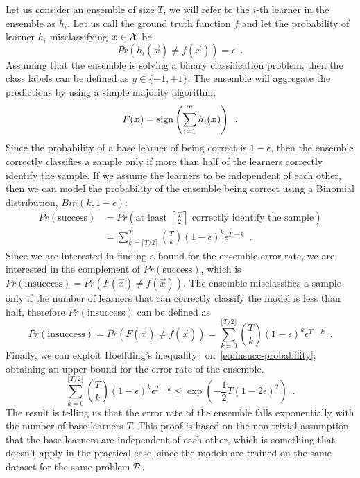 Let us consider an ensemble of size $T$, we will refer to the $i$-th learner in the ensemble as
$h_i$. Let us call the ground truth function $f$ and let the probability of learner $h_i$
misclassifying $\boldsymbol{x} \in \mathcal{X}$ be
\begin{equation}
	\label{eq:error-rate}
	Pr(h_i(\vec{x}) \neq f(\vec{x})) = \epsilon \enspace.
\end{equation}
Assuming that the ensemble is solving a binary classification problem, then the class labels can be defined as $y \in \{-1, +1\}$. The ensemble will aggregate the predictions by using a simple majority algorithm; 
\begin{equation}
	\label{eq:ensemble-aggregation}
	F(\boldsymbol{x}) = \operatorname{sign}\left(\sum_{i = 1}^{T}h_i(\boldsymbol{x})\right) \enspace.
\end{equation}
Since the probability of a base learner of being correct is $1 - \epsilon$, then the ensemble
correctly classifies a sample only if more than half of the learners correctly identify the sample.
If we assume the learners to be independent of each other, then we can model the probability of the
ensemble being correct using a Binomial distribution, $Bin(k, 1 - \epsilon)$:
\begin{equation}
	\label{eq:succ-probability}
	\begin{aligned}
		Pr(\text{success}) & = Pr\left(\text{at least } \left\lceil{\frac{T}{2}}\right\rceil \text{ correctly identify
		the sample}\right)
		\\
			   & = \sum_{k = \lceil{T / 2}\rceil}^T \binom{T}{k} (1 - \epsilon)^k
			   \epsilon^{T - k} \enspace.
	\end{aligned}
\end{equation}
Since we are interested in finding a bound for the ensemble error rate, we are interested in the
complement of $Pr(\text{success})$, which is $Pr(\text{insuccess}) = Pr(F(\vec{x}) \neq
f(\vec{x}))$. The ensemble misclassifies a sample only if the number of learners that can correctly
classify the model is less than half, therefore $Pr(\text{insuccess})$ can be defined as
\begin{equation}
	\label{eq:insucc-probability}
	Pr(\text{insuccess}) = Pr(F(\vec{x}) \neq f(\vec{x})) = \sum_{k = 0}^{\lfloor{T / 2}\rfloor}
	\binom{T}{k} (1 - \epsilon)^k \epsilon^{T - k} \enspace.
\end{equation}
Finally, we can exploit Hoeffding's inequality~\cite{ZhouZhi-Hua2021ML}
on~\ref{eq:insucc-probability}, obtaining an upper bound for the error rate of the ensemble.
\begin{equation}
	\label{eq:hoeffding}
	\sum_{k = 0}^{\lfloor T / 2 \rfloor}\binom{T}{k} (1 - \epsilon)^k\epsilon^{T - k} \leq
	\exp\left(-\frac{1}{2}T(1 - 2\epsilon)^2\right) \enspace.
\end{equation}
The result is telling us that the error rate of the ensemble falls exponentially with the
number of base learners $T$. This proof is based on the non-trivial assumption that the base
learners are independent of each other, which is something that doesn't apply in the practical
case, since the models are trained on the same dataset for the same problem $\mathcal{P}$.

